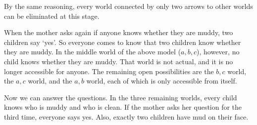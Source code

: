 By the same reasoning, every world connected by only two arrows to other
worlds can be eliminated at this stage.

\begin{center}
\end{center}

When the mother asks again if anyone knows whether they are muddy, two children
say `yes'. So everyone comes to know that two children know whether they are
muddy. In the middle world of the above model ($a,b,c$), however, no child
knows whether they are muddy. That world is not actual, and it is no longer
accessible for anyone. The remaining open possibilities are the $b,c$ world, the
$a,c$ world, and the $a,b$ world, each of which is only accessible from itself.

Now we can answer the questions. In the three remaining worlds, every child
knows who is muddy and who is clean. If the mother asks her question for the
third time, everyone says yes. Also, exactly two children have mud on their
face.

